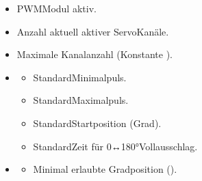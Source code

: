 \documentclass[letterpaper,10pt,english]{sphinxmanual}
\begin{document}
\sphinxAtStartPar
{}
\begin{itemize}
\item {} 
\sphinxAtStartPar
{}  \textendash{} PWM\sphinxhyphen{}Modul aktiv.

\item {} 
\sphinxAtStartPar
{}  \textendash{} Anzahl aktuell aktiver Servo\sphinxhyphen{}Kanäle.

\item {} 
\sphinxAtStartPar
{}  \textendash{} Maximale Kanalanzahl (Konstante ).

\item {} \begin{description}
\begin{itemize}
\item {} 
\sphinxAtStartPar
{}  \textendash{} Standard\sphinxhyphen{}Minimalpuls.

\item {} 
\sphinxAtStartPar
{}  \textendash{} Standard\sphinxhyphen{}Maximalpuls.

\item {} 
\sphinxAtStartPar
{}  \textendash{} Standard\sphinxhyphen{}Startposition (Grad).

\item {} 
\sphinxAtStartPar
{}  \textendash{} Standard\sphinxhyphen{}Zeit für 0↔180°\sphinxhyphen{}Vollausschlag.

\end{itemize}

\end{description}

\item {} \begin{description}
\begin{itemize}
\item {} 
\sphinxAtStartPar
{}  \textendash{} Minimal erlaubte Gradposition ().


\end{itemize}
\end{description}
\end{itemize}
\end{document}
